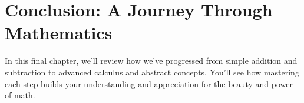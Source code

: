 \chapter{Conclusion: A Journey Through Mathematics}
In this final chapter, we'll review how we've progressed from simple addition and subtraction to advanced calculus and abstract concepts. You'll see how mastering each step builds your understanding and appreciation for the beauty and power of math.